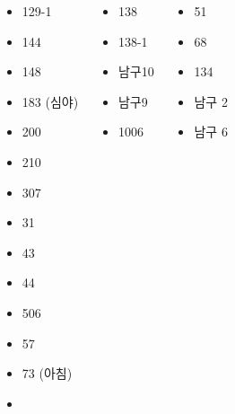 \documentclass[	14pt, 
							a0paper, 
							landscape, 	%
							margin=0mm, %
							innermargin=4mm,  		%
							blockverticalspace=4mm, %
							colspace=5mm, 
							subcolspace=0mm
							]{tikzposter}
\begin{document}
\begin{columns}
		{
			\setlength{\leftmargini}{5em}			
			\setlength{\labelsep}{1em} %
			\begin{LARGE}
			\begin{itemize}
			\item 	129-1
			\item 	144
			\item 	148
			\item 	183 (심야)
			\item 	200
			\item 	210
			\item 	307
			\item 	31
			\item 	43
			\item 	44
			\item 	506
			\item 	57
			\item 	73 (아침)
			\item 	
			\end{itemize}
			\end{LARGE}
		}		







		{
			\setlength{\leftmargini}{5em}			
			\setlength{\labelsep}{1em} %
			\begin{LARGE}
			\begin{itemize}
			\item 	138
			\item 	138-1
			\item 	남구10
			\item 	남구9
			\item 	1006
			\end{itemize}
			\end{LARGE}
		}		


		{
			\setlength{\leftmargini}{5em}			
			\setlength{\labelsep}{1em} %
			\begin{LARGE}
			\begin{itemize}
			\item 	51
			\item 	68
			\item 	134
			\item 	남구 2
			\item 	남구 6
			\end{itemize}
			\end{LARGE}
		}		



\end{columns}
\end{document}
